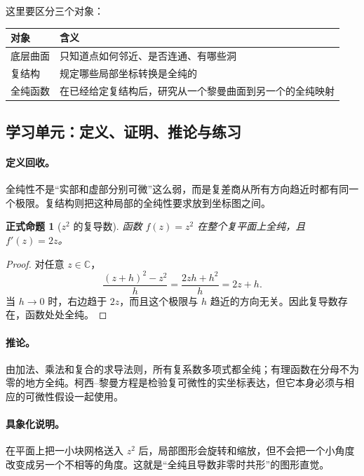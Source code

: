 \documentclass[UTF8,fontset=none,a4paper,11pt]{ctexart}
\theoremstyle{foundation-definition}
\theoremstyle{foundation-theorem}
\theoremstyle{foundation-proposition}
\newtheorem{proposition}[definition]{正式命题}
\theoremstyle{foundation-example}
\theoremstyle{foundation-remark}
\theoremstyle{foundation-theorem}
\begin{document}
这里要区分三个对象：

\begin{center}
\begin{tabularx}{\textwidth}{>{\ttfamily}lX}
\toprule
对象 & 含义 \\
\midrule
底层曲面 & 只知道点如何邻近、是否连通、有哪些洞 \\
复结构 & 规定哪些局部坐标转换是全纯的 \\
全纯函数 & 在已经给定复结构后，研究从一个黎曼曲面到另一个的全纯映射 \\
\bottomrule
\end{tabularx}
\end{center}

\subsection{学习单元：定义、证明、推论与练习}

\paragraph{定义回收。}
全纯性不是“实部和虚部分别可微”这么弱，而是复差商从所有方向趋近时都有同一个极限。复结构则把这种局部的全纯性要求放到坐标图之间。

\begin{proposition}[\(z^2\) 的复导数]\label{prop:z-square-holomorphic}
函数 \(f(z)=z^2\) 在整个复平面上全纯，且 \(f'(z)=2z\)。
\end{proposition}

\begin{proof}
对任意 \(z\in\mathbb C\)，
\[
\frac{(z+h)^2-z^2}{h}
=\frac{2zh+h^2}{h}=2z+h.
\]
当 \(h\to0\) 时，右边趋于 \(2z\)，而且这个极限与 \(h\) 趋近的方向无关。因此复导数存在，函数处处全纯。
\end{proof}

\paragraph{推论。}
由加法、乘法和复合的求导法则，所有复系数多项式都全纯；有理函数在分母不为零的地方全纯。柯西--黎曼方程是检验复可微性的实坐标表达，但它本身必须与相应的可微性假设一起使用。

\paragraph{具象化说明。}
在平面上把一小块网格送入 \(z^2\) 后，局部图形会旋转和缩放，但不会把一个小角度改变成另一个不相等的角度。这就是“全纯且导数非零时共形”的图形直觉。
\end{document}
